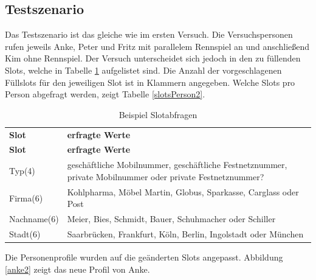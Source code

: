 \documentclass[12pt,a4paper]{scrartcl}
\begin{document}
\subsection{Testszenario}
Das Testszenario ist das gleiche wie im ersten Versuch. Die Versuchspersonen rufen jeweils Anke, Peter und Fritz mit parallelem Rennspiel an und anschließend Kim ohne Rennspiel. Der Versuch unterscheidet sich jedoch in den zu füllenden Slots, welche in Tabelle \ref{slots2} aufgelistet sind. Die Anzahl der vorgeschlagenen Füllslots für den jeweiligen Slot ist in Klammern angegeben.
Welche Slots pro Person abgefragt werden, zeigt Tabelle \ref{slotsPerson2}. 
\begin{longtable}{p{4cm}p{10cm}}
	\label{slots2}\\
	\caption[Slotabfragen]{Beispiel Slotabfragen}\\
	\hline
	\textbf{Slot} &\textbf{erfragte Werte}\\
	\hline
	\endfirsthead
	\hline
	\textbf{Slot} &	\textbf{erfragte Werte}\\
	\hline
	\endhead
Typ(4) & geschäftliche Mobilnummer, geschäftliche Festnetznummer, private Mobilnummer oder private Festnetznummer?\\
Firma(6) & Kohlpharma, Möbel Martin, Globus, Sparkasse, Carglass oder Post\\
Nachname(6) & Meier, Bies, Schmidt, Bauer, Schuhmacher oder Schiller \\
Stadt(6) & Saarbrücken, Frankfurt, Köln, Berlin, Ingolstadt oder München\\
\hline
\end{longtable}

Die Personenprofile wurden auf die geänderten Slots angepasst. Abbildung \ref{anke2} zeigt das neue Profil von Anke. 
\end{document}
